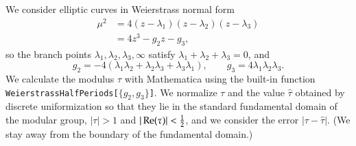 \documentclass[Thesis]{subfiles}
\begin{document}
We consider elliptic curves in Weierstrass normal form
\begin{equation}
  \label{eq:Weierstrass_normal_form}
  \begin{split}
    \mu^2
    &=4(z-\lambda_1)(z-\lambda_2)(z-\lambda_3)\\
    &=4z^3-g_2z-g_3,
  \end{split}
\end{equation}
so the branch points $\lambda_{1},\lambda_{2},\lambda_{3},\infty$
satisfy $\lambda_1+\lambda_2+\lambda_3=0$, and 
\begin{equation}
  \label{eq:g-invariants}
  g_{2}=-4(\lambda_1\lambda_2+\lambda_2\lambda_3+\lambda_3\lambda_1),
  \qquad 
  g_{3}=4\lambda_1\lambda_2\lambda_3.
\end{equation}
We calculate the modulus $\tau$ with Mathematica using the built-in
function
\texttt{Wei\-er\-strass\-Half\-Pe\-ri\-ods[$\{g_2,g_3\}$]}. We
normalize $\tau$ and the value $\hat\tau$ obtained by discrete
uniformization so that they lie in the standard fundamental domain of
the modular group, $|\tau|>1$ and $|\operatorname{Re}(\tau)| < \frac{1}{2}$, and we
consider the error $|\tau-\hat \tau|$. (We stay away from the boundary
of the fundamental domain.)

\end{document}

